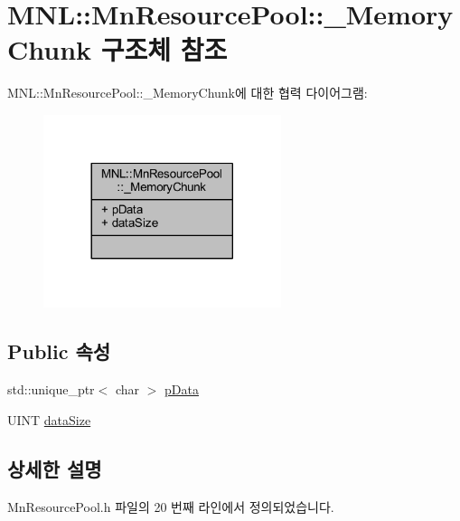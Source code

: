 \hypertarget{struct_m_n_l_1_1_mn_resource_pool_1_1___memory_chunk}{}\section{M\+NL\+:\+:Mn\+Resource\+Pool\+:\+:\+\_\+\+Memory\+Chunk 구조체 참조}
\label{struct_m_n_l_1_1_mn_resource_pool_1_1___memory_chunk}


M\+NL\+:\+:Mn\+Resource\+Pool\+:\+:\+\_\+\+Memory\+Chunk에 대한 협력 다이어그램\+:\nopagebreak
\begin{figure}[H]
\begin{center}
\leavevmode
\includegraphics[width=197pt]{struct_m_n_l_1_1_mn_resource_pool_1_1___memory_chunk__coll__graph}
\end{center}
\end{figure}
\subsection*{Public 속성}
\begin{DoxyCompactItemize}
\item 
std\+::unique\+\_\+ptr$<$ char $>$ \hyperlink{struct_m_n_l_1_1_mn_resource_pool_1_1___memory_chunk_ad2b4ab69a299789920cd165e1a6c7196}{p\+Data}
\item 
U\+I\+NT \hyperlink{struct_m_n_l_1_1_mn_resource_pool_1_1___memory_chunk_a802a418104a49d2cb3a865d329cd1175}{data\+Size}
\end{DoxyCompactItemize}


\subsection{상세한 설명}


Mn\+Resource\+Pool.\+h 파일의 20 번째 라인에서 정의되었습니다.



